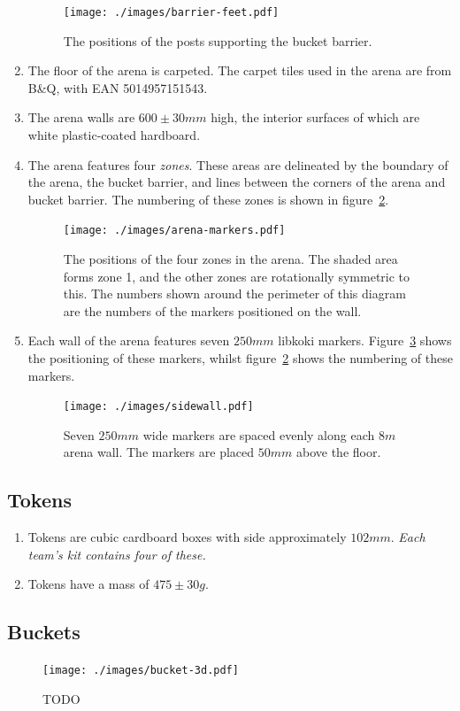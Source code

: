 \begin{enumerate}
  \begin{figure}
    \centering
    \texttt{[image: ./images/barrier-feet.pdf]}
    \caption{The positions of the posts supporting the bucket barrier.}
    \label{fig:bucker-barrier-legs}
  \end{figure}

\item The floor of the arena is carpeted.  The carpet tiles used in the arena are from B\&Q, with EAN 5014957151543.

\item The arena walls are $600\pm30mm$ high, the interior surfaces of which are white plastic-coated hardboard.

\item The arena features four \textit{zones}.  These areas are delineated by the boundary of the arena, the bucket barrier, and lines between the corners of the arena and bucket barrier.  The numbering of these zones is shown in figure~\ref{fig:arena-zones}.

  \begin{figure}
    \centering
    \texttt{[image: ./images/arena-markers.pdf]}
    \caption{The positions of the four zones in the arena.  The shaded area forms zone 1, and the other zones are rotationally symmetric to this.  The numbers shown around the perimeter of this diagram are the numbers of the markers positioned on the wall.}
    \label{fig:arena-zones}
  \end{figure}

\item Each wall of the arena features seven $250mm$ libkoki markers.  Figure~\ref{fig:arena-wall} shows the positioning of these markers, whilst figure~\ref{fig:arena-zones} shows the numbering of these markers.

  \begin{figure}
    \centering
    \texttt{[image: ./images/sidewall.pdf]}
    \caption{Seven $250mm$ wide markers are spaced evenly along each $8m$ arena wall.  The markers are placed $50mm$ above the floor.}
    \label{fig:arena-wall}
  \end{figure}

\end{enumerate}

\subsection{Tokens}
\label{sub:Tokens}
\begin {enumerate}
\item Tokens are cubic cardboard boxes with side approximately $102mm$.
\emph{Each team's kit contains four of these.}
\item Tokens have a mass of $475\pm30g$.
\end {enumerate}

\subsection{Buckets}
\label{sub:buckets}
\begin{figure}
  \centering
  \texttt{[image: ./images/bucket-3d.pdf]}
  \caption{TODO}
  \label{fig:bucket-3d}
\end{figure}


\clearpage

